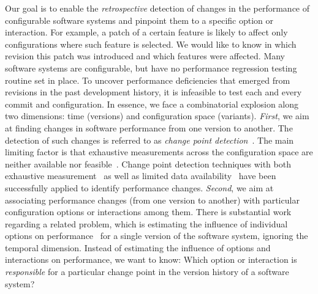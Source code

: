 \documentclass[sigconf]{acmart}
\begin{document}
	Our goal is to enable the \emph{retrospective} detection of changes in the performance of configurable software systems and pinpoint them to a specific option or interaction. For example, a patch of a certain feature is likely to affect only configurations where such feature is selected. 
	We would like to know in which revision this patch was introduced and which features were affected.
	Many software systems are configurable, but have no performance regression testing routine set in place. 
	To uncover performance deficiencies that emerged from revisions in the past development history, it is infeasible to test each and every commit and configuration. 
	In essence, we face a combinatorial explosion along two dimensions: time (versions) and configuration space (variants).
	\emph{First}, we aim at finding changes in software performance from one version to another.
	The detection of such changes is referred to as \emph{change point detection}~\cite{daly_industry_2020,cityIdentifying2014,huang_performance_2014,muhlbauer_accurate_2019,sandoval_alcocer_learning_2016,alcocer_prioritizing_2020}.
	The main limiting factor is that exhaustive measurements across the configuration space are neither available nor feasible~\cite{white_selecting_2009}.
	Change point detection techniques with both exhaustive measurement~\cite{cityIdentifying2014,daly_industry_2020} as well as limited data availability~\cite{sandoval_alcocer_learning_2016,alcocer_prioritizing_2020,huang_performance_2014,muhlbauer_accurate_2019} have been successfully applied to identify performance changes.
	\emph{Second}, we aim at associating performance changes (from one version to another) with particular configuration options or interactions among them.
	There is substantial work  regarding a related problem, which is estimating the influence of individual options on performance~\cite{siegmundPredictingPerformanceAutomated2012,siegmundPerformanceinfluenceModelsHighly2015,sarkarCostEfficientSamplingPerformance,haDeepPerf2019} for a single version of the software system, ignoring the temporal dimension. Instead of estimating the influence of options and interactions on performance, we want to know: Which option or interaction is \emph{responsible} for a particular change point in the version history of a software system?
	
\end{document}
